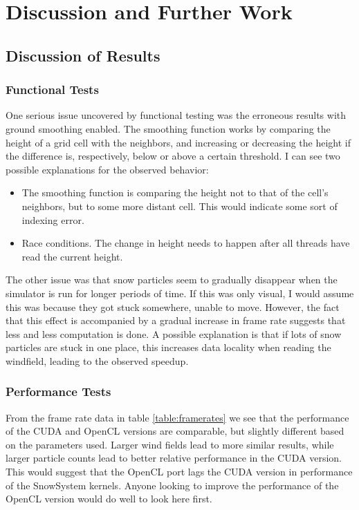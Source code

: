 \chapter{Discussion and Further Work}

\section{Discussion of Results}
\subsection{Functional Tests}
One serious issue uncovered by functional testing was the erroneous results with ground smoothing enabled. The smoothing function works by comparing the height of a grid cell with the neighbors, and increasing or decreasing the height if the difference is, respectively, below or above a certain threshold. I can see two possible explanations for the observed behavior:
\begin{itemize}
\item The smoothing function is comparing the height not to that of the cell's neighbors, but to some more distant cell. This would indicate some sort of indexing error.
\item Race conditions. The change in height needs to happen after all threads have read the current height.
\end{itemize}
The other issue was that snow particles seem to gradually disappear when the simulator is run for longer periods of time. If this was only visual, I would assume this was because they got stuck somewhere, unable to move. However, the fact that this effect is accompanied by a gradual increase in frame rate suggests that less and less computation is done. A possible explanation is that if lots of snow particles are stuck in one place, this increases data locality when reading the windfield, leading to the observed speedup.

\subsection{Performance Tests}
From the frame rate data in table \ref{table:framerates} we see that the performance of the CUDA and OpenCL versions are comparable, but slightly different based on the parameters used. Larger wind fields lead to more similar results, while larger particle counts lead to better relative performance in the CUDA version. This would suggest that the OpenCL port lags the CUDA version in performance of the SnowSystem kernels. Anyone looking to improve the performance of the OpenCL version would do well to look here first.


